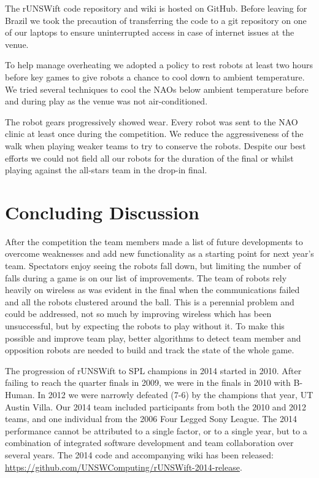 \documentclass[runningheads,a4paper]{llncs}
\begin{document}
The rUNSWift code repository and wiki is hosted on GitHub. Before leaving for Brazil we took the precaution of transferring the code to a git repository on one of our laptops to ensure uninterrupted access in case of internet issues at the venue. 

To help manage overheating we adopted a policy to rest robots at least two hours before key games to give robots a chance to cool down to ambient temperature. We tried several techniques to cool the NAOs below ambient temperature before and during play as the venue was not air-conditioned. 

The robot gears progressively showed wear. Every robot was sent to the NAO clinic at least once during the competition. We reduce the aggressiveness of the walk when playing weaker teams to try to conserve the robots. Despite our best efforts we could not field all our robots for the duration of the final or whilst playing against the all-stars team in the drop-in final.





\section{Concluding Discussion}

After the competition the team members made a list of future developments to overcome weaknesses and add new functionality as a starting point for next year's team. Spectators enjoy seeing the robots fall down, but limiting the number of falls during a game is on our list of improvements. The team of robots rely heavily on wireless as was evident in the final when the communications failed and all the robots clustered around the ball. This is a perennial problem and could be addressed, not so much by improving wireless which has been unsuccessful, but by expecting the robots to play without it. To make this possible and improve team play, better algorithms to detect team member and opposition robots are needed to build and track the state of the whole game. 

The progression of rUNSWift to SPL champions in 2014 started in 2010. After failing to reach the quarter finals in 2009, we were in the finals in 2010 with B-Human. In 2012 we were narrowly defeated (7-6) by the champions that year, UT Austin Villa. Our 2014 team included participants from both the 2010 and 2012 teams, and one individual from the 2006 Four Legged Sony League. The 2014 performance cannot be attributed to a single factor, or to a single year, but to a combination of integrated software development and team collaboration over several years. The 2014 code and accompanying wiki has been released: \url{https://github.com/UNSWComputing/rUNSWift-2014-release}.
\end{document}

